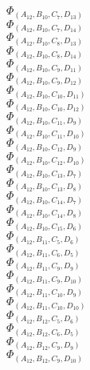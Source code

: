 \documentclass[14pt]{article}
\begin{document}
    $\Phi_{({A}_{12}, {B}_{10}, {C}_{7}, {D}_{13})}$ \\ 
    $\Phi_{({A}_{12}, {B}_{10}, {C}_{7}, {D}_{14})}$ \\ 
    $\Phi_{({A}_{12}, {B}_{10}, {C}_{8}, {D}_{13})}$ \\ 
    $\Phi_{({A}_{12}, {B}_{10}, {C}_{8}, {D}_{14})}$ \\ 
    $\Phi_{({A}_{12}, {B}_{10}, {C}_{9}, {D}_{11})}$ \\ 
    $\Phi_{({A}_{12}, {B}_{10}, {C}_{9}, {D}_{12})}$ \\ 
    $\Phi_{({A}_{12}, {B}_{10}, {C}_{10}, {D}_{11})}$ \\ 
    $\Phi_{({A}_{12}, {B}_{10}, {C}_{10}, {D}_{12})}$ \\ 
    $\Phi_{({A}_{12}, {B}_{10}, {C}_{11}, {D}_{9})}$ \\ 
    $\Phi_{({A}_{12}, {B}_{10}, {C}_{11}, {D}_{10})}$ \\ 
    $\Phi_{({A}_{12}, {B}_{10}, {C}_{12}, {D}_{9})}$ \\ 
    $\Phi_{({A}_{12}, {B}_{10}, {C}_{12}, {D}_{10})}$ \\ 
    $\Phi_{({A}_{12}, {B}_{10}, {C}_{13}, {D}_{7})}$ \\ 
    $\Phi_{({A}_{12}, {B}_{10}, {C}_{13}, {D}_{8})}$ \\ 
    $\Phi_{({A}_{12}, {B}_{10}, {C}_{14}, {D}_{7})}$ \\ 
    $\Phi_{({A}_{12}, {B}_{10}, {C}_{14}, {D}_{8})}$ \\ 
    $\Phi_{({A}_{12}, {B}_{10}, {C}_{15}, {D}_{6})}$ \\ 
    $\Phi_{({A}_{12}, {B}_{11}, {C}_{5}, {D}_{6})}$ \\ 
    $\Phi_{({A}_{12}, {B}_{11}, {C}_{6}, {D}_{5})}$ \\ 
    $\Phi_{({A}_{12}, {B}_{11}, {C}_{9}, {D}_{9})}$ \\ 
    $\Phi_{({A}_{12}, {B}_{11}, {C}_{9}, {D}_{10})}$ \\ 
    $\Phi_{({A}_{12}, {B}_{11}, {C}_{10}, {D}_{9})}$ \\ 
    $\Phi_{({A}_{12}, {B}_{11}, {C}_{10}, {D}_{10})}$ \\ 
    $\Phi_{({A}_{12}, {B}_{12}, {C}_{5}, {D}_{6})}$ \\ 
    $\Phi_{({A}_{12}, {B}_{12}, {C}_{6}, {D}_{5})}$ \\ 
    $\Phi_{({A}_{12}, {B}_{12}, {C}_{9}, {D}_{9})}$ \\ 
    $\Phi_{({A}_{12}, {B}_{12}, {C}_{9}, {D}_{10})}$ \\ 
\end{document}
